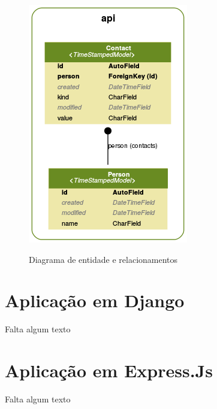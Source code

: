   \begin{figure}[H]
  \setlength{\abovecaptionskip}{0pt}
  \setlength{\belowcaptionskip}{0pt}
  \caption[Diagrama de entidade e relacionamentos]{Diagrama de entidade e relacionamentos}
  \centering
  \includegraphics[width=.55\textwidth]{imagem/der.png}
  \captionsetup{justification=centering}
  \label{fig:der}
  \end{figure}
  
\section{Aplicação em Django}
\label{desenvolvimento-django}

  Falta algum texto

\section{Aplicação em Express.Js}
\label{escopo-projeto}

  Falta algum texto